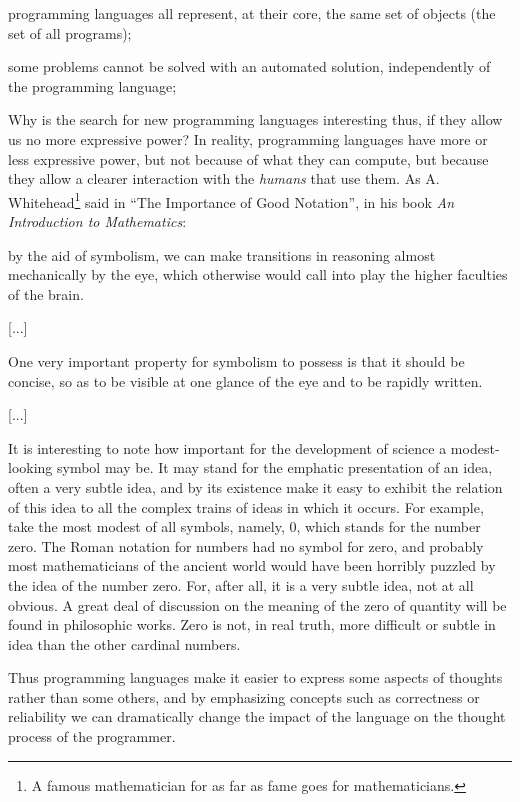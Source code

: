 \begin{inparaenum}
\item programming languages all represent, at their core, the same set of objects (the set of all programs);
\item some problems cannot be solved with an automated solution, independently of the programming language;
\end{inparaenum}

Why is the search for new programming languages interesting thus, if they allow us no more expressive power? In reality, programming languages have more or less expressive power, but not because of what they can compute, but because they allow a clearer interaction with the \textit{humans} that use them. As A. Whitehead\footnote{A famous mathematician for as far as fame goes for mathematicians.} said in ``The Importance of Good Notation'', in his book \textit{An Introduction to Mathematics}:

\begin{displayquote}
[...] by the aid of symbolism, we can make transitions in reasoning almost mechanically by the eye, which otherwise would call into play the higher faculties of the brain.

[...]

One very important property for symbolism to possess is that it should be concise, so as to be visible at one glance of the eye and to be rapidly written. 

[...]

It is interesting to note how important for the development of science a modest-looking symbol may be. It may stand for the emphatic presentation of an idea, often a very subtle idea, and by its existence make it easy to exhibit the relation of this idea to all the complex trains of ideas in which it occurs. For example, take the most modest of all symbols, namely, 0, which stands for the number zero. The Roman notation for numbers had no symbol for zero, and probably most mathematicians of the ancient world would have been horribly puzzled by the idea of the number zero. For, after all, it is a very subtle idea, not at all obvious. A great deal of discussion on the meaning of the zero of quantity will be found in philosophic works. Zero is not, in real truth, more difficult or subtle in idea than the other cardinal numbers.
\end{displayquote}

Thus programming languages make it easier to express some aspects of thoughts rather than some others, and by emphasizing concepts such as correctness or reliability we can dramatically change the impact of the language on the thought process of the programmer.


